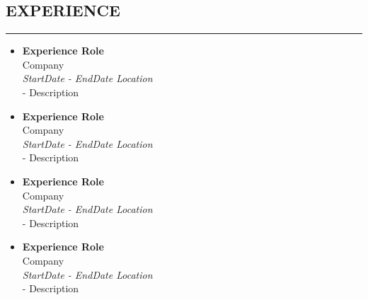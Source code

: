 \documentclass[11 pt, a4paper, usenames, dvipsnames]{article}
\newcommand*{\RoleFont}{%
      \fontsize{14}{8}%
\color{Black}%
\bf
      \selectfont}
\newcommand*{\DateFont}{%
      \fontsize{10}{8}%
\color{Gray}%
\it
      \selectfont}
\newcommand*{\SectionFont}{%
      \fontsize{16}{5}%
\color{CV_Color}%
\bf
\selectfont}
\begin{document}
\setlength{\columnsep}{2.8em}
\vspace{-2pt}
\begin{paracol}{2} 


\section*{\SectionFont\faCubes\enskip  EXPERIENCE}\vspace{-15pt}
\par\noindent\rule{0.22\textwidth}{0.4pt}
\begin{itemize}[leftmargin=0pt,align=left,labelwidth=\parindent,labelsep=0pt]

\item[] {\RoleFont Experience Role} \\
\normalfont Company \\ 
{\DateFont StartDate - EndDate \hfill Location } \\ 
{\color{CV_Color}\LARGE - }{Description}

\item[] {\RoleFont Experience Role} \\
\normalfont Company \\ 
{\DateFont StartDate - EndDate \hfill Location } \\ 
{\color{CV_Color}\LARGE - }{Description}

\item[] {\RoleFont Experience Role} \\
\normalfont Company \\ 
{\DateFont StartDate - EndDate \hfill Location } \\ 
{\color{CV_Color}\LARGE - }{Description}

\item[] {\RoleFont Experience Role} \\
\normalfont Company \\ 
{\DateFont StartDate - EndDate \hfill Location } \\ 
{\color{CV_Color}\LARGE - }{Description}
\end{itemize}



\end{paracol}
\end{document}
